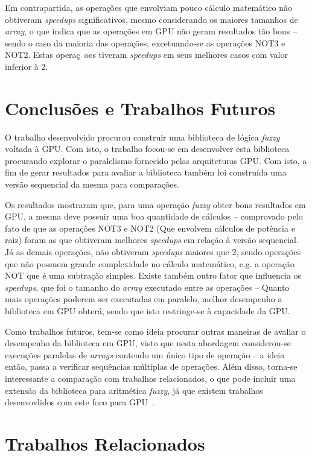 \documentclass[12pt]{article}
\begin{document}
Em contrapartida, as operações que envolviam pouco cálculo matemático não obtiveram \textit{speedups} significativos, mesmo considerando os maiores tamanhos de \textit{array}, o que indica que as operações em GPU não geram resultados tão bons -- sendo o caso da maioria das operações, excetuando-se as operações NOT3 e NOT2. Estas operaç~oes tiveram \textit{speedups} em seus melhores casos com valor inferior à 2.

\section{Conclusões e Trabalhos Futuros}
\label{sec:conclusoes}

	O trabalho desenvolvido procurou construir uma	biblioteca de lógica \textit{fuzzy} voltada à GPU. Com isto, o trabalho focou-se em desenvolver esta biblioteca procurando explorar o paralelismo fornecido pelas arquiteturas GPU. Com isto, a fim de gerar resultados para avaliar a biblioteca também foi construída uma versão sequencial da mesma para comparações.
	
	Os resultados mostraram que, para uma operação \textit{fuzzy} obter bons resultados em GPU, a mesma deve possuir uma boa quantidade de cálculos -- comprovado pelo fato de que as operações NOT3 e NOT2 (Que envolvem cálculos de potência e raiz) foram as que obtiveram melhores \textit{speedups} em relação à versão sequencial. Já as demais operações, não obtiveram \textit{speedups} maiores que 2, sendo operações que não possuem grande complexidade no cálculo matemático, e.g. a operação NOT que é uma subtração simples. Existe também outro fator que influencia os \textit{speedups}, que foi o tamanho do \textit{array} executado entre as operações -- Quanto mais operações poderem ser executadas em paralelo, melhor desempenho a biblioteca em GPU obterá, sendo que isto restringe-se à capacidade da GPU.
	
	Como trabalhos futuros, tem-se como ideia procurar outras maneiras de avaliar o desempenho da biblioteca em GPU, visto que nesta abordagem considerou-se execuções paralelas de \textit{arrays} contendo um único tipo de operação -- a ideia então, passa a verificar sequências múltiplas de operações. Além disso, torna-se interessante a comparação com trabalhos relacionados, o que pode incluir uma extensão da biblioteca para aritmética \textit{fuzzy}, já que existem trabalhos desenvovlidos com este foco para GPU~\cite{defour:14}.
	
\section{Trabalhos Relacionados}
\label{sec:trabalhos}
\end{document}
